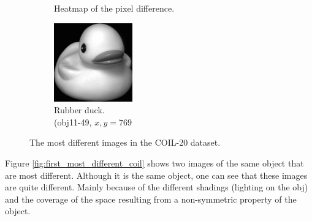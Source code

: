 \begin{figure}[!]
\begin{subfigure}[t]{0.32\columnwidth}
    	\caption{Heatmap of the pixel difference.}
        \label{fig:heatmap_coil20_worst}
    \end{subfigure}
     \hfill
     \begin{subfigure}[t]{0.32\columnwidth}
    	\centering
    	\includegraphics[width=\columnwidth]{images/coil-20-proc/obj11__49.png}
    	\caption{Rubber duck. \\ (obj11-49, $x,y=769$}
        \label{fig:obj11__49}
    \end{subfigure}
     \caption[Most Different COIL-20 Images]{The most different images in the COIL-20 dataset.}
    \label{fig:most_different_coil}
\end{figure}

Figure \ref{fig:first_most_different_coil} shows two images of the same object that are most different. Although it is the same object, one can see that these images are quite different. Mainly because of the different shadings (lighting on the obj) and the coverage of the space resulting from a non-symmetric property of the object.

